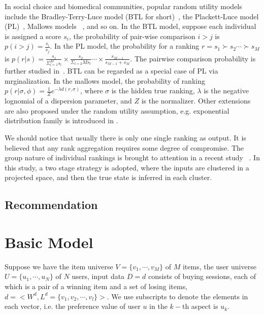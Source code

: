 \documentclass{sig-alternate}
\begin{document}
In social choice and biomedical communities, popular random utility models include the Bradley-Terry-Luce model (BTL for short)~\cite{Hunter2004MM}, the Plackett-Luce model (PL)~\cite{AzariSoufiani2013Generalized}, Mallows models ~\cite{Lu2011Learning}, and so on. In the BTL model, suppose each individual is assigned a score $s_i$, the probability of pair-wise comparison $i>j$ is $p(i>j)=\frac{s_i}{s_j}$. In the PL model, the probability for a ranking $r=s_1 \succ s_2 \cdots \succ s_M$ is $ p(r|s)=\frac{s_1}{\Sigma_{l=1}^{M} s_l} \times \frac{s_2}{\Sigma_{l=2}{M} s_l} \cdots \times \frac{s_{M-1}}{s_{M-1}+s_{M}}$. The pairwise comparison probability is further studied in~\cite{Gleich2011Rank}. BTL can be regarded as a special case of PL via mrginalization. In the mallows model, the probability of ranking $p(r|\sigma,\phi)=\frac{1}{Z} e^{-\lambda d(r,\sigma)}$, where $\sigma$ is the hidden true ranking, $\lambda$ is the negative lognomial of a dispersion parameter, and $Z$ is the normalizer. Other extensions are also proposed under the random utility assumption, e.g. exponential distribution family is introduced in \cite{Parkes2012Random}.

We should notice that usually there is only one single ranking as output. It is believed that any rank aggregation requires some degree of compromise. The group nature of individual rankings is brought to attention in a recent study ~\cite{Wu2015Clustering}. In this study, a two stage strategy is adopted, where the inputs are clustered in a projected space, and then the true state is inferred in each cluster.



\subsection{Recommendation}



\section{Basic Model}\label{sec:model1}

Suppose we have the item universe $V=\{v_1,\cdots,v_M\}$ of $M$ items, the user universe $U=\{u_1,\cdots,u_N\}$ of $N$ users, input data $D={d}$ consists of buying sessions, each of which is a pair of a winning item and a set of losing items, $d=<W^d,L^d=\{v_1,v_2,\cdots,v_l\}>$. We use subscripts to denote the elements in each vector, i.e. the preference value of user $u$ in the $k-$th aspect is $u_k$. 
\end{document}
